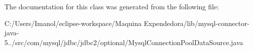 The documentation for this class was generated from the following file\+:\begin{DoxyCompactItemize}
\item 
C\+:/\+Users/\+Imanol/eclipse-\/workspace/\+Maquina Expendedora/lib/mysql-\/connector-\/java-\/5../src/com/mysql/jdbc/jdbc2/optional/Mysql\+Connection\+Pool\+Data\+Source.\+java\end{DoxyCompactItemize}
